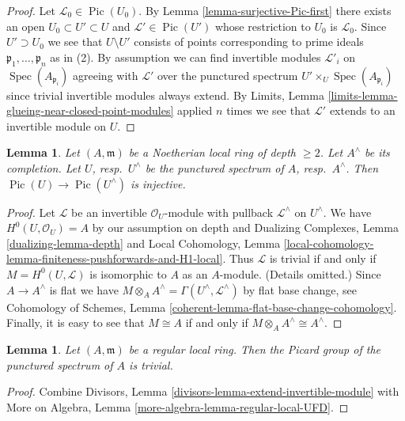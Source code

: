 \documentclass{stacks-project}
\theoremstyle{plain}
\newtheorem{lemma}[subsection]{Lemma}
\theoremstyle{definition}
\theoremstyle{remark}
\numberwithin{equation}{subsection}
\def\Spec{\mathop{\mathrm{Spec}}}
\def\Pic{\mathop{\mathrm{Pic}}\nolimits}
\begin{document}
\begin{proof}
Let $\mathcal{L}_0 \in \Pic(U_0)$. By
Lemma \ref{lemma-surjective-Pic-first}
there exists an open $U_0 \subset U' \subset U$
and $\mathcal{L}' \in \Pic(U')$ whose restriction
to $U_0$ is $\mathcal{L}_0$.
Since $U' \supset U_0$ we see that $U \setminus U'$
consists of points corresponding to prime ideals
$\mathfrak p_1, \ldots, \mathfrak p_n$ as in (2).
By assumption we can find invertible modules
$\mathcal{L}'_i$ on $\Spec(A_{\mathfrak p_i})$ agreeing with
$\mathcal{L}'$ over the punctured spectrum
$U' \times_U \Spec(A_{\mathfrak p_i})$ since
trivial invertible modules always extend.
By Limits, Lemma \ref{limits-lemma-glueing-near-closed-point-modules}
applied $n$ times we see that $\mathcal{L}'$ extends to an
invertible module on $U$.
\end{proof}

\begin{lemma}
\label{lemma-local-pic-to-completion}
Let $(A, \mathfrak m)$ be a Noetherian local ring of depth $\geq 2$.
Let $A^\wedge$ be its completion. Let $U$, resp.\ $U^\wedge$
be the punctured spectrum of $A$, resp.\ $A^\wedge$. Then
$\Pic(U) \to \Pic(U^\wedge)$ is injective.
\end{lemma}

\begin{proof}
Let $\mathcal{L}$ be an invertible $\mathcal{O}_U$-module
with pullback $\mathcal{L}^\wedge$ on $U^\wedge$.
We have $H^0(U, \mathcal{O}_U) = A$ by our assumption on depth and
Dualizing Complexes, Lemma \ref{dualizing-lemma-depth} and
Local Cohomology, Lemma
\ref{local-cohomology-lemma-finiteness-pushforwards-and-H1-local}.
Thus $\mathcal{L}$ is trivial if and only if
$M = H^0(U, \mathcal{L})$ is isomorphic to $A$ as an $A$-module.
(Details omitted.) Since $A \to A^\wedge$ is flat
we have $M \otimes_A A^\wedge = \Gamma(U^\wedge, \mathcal{L}^\wedge)$
by flat base change, see
Cohomology of Schemes, Lemma \ref{coherent-lemma-flat-base-change-cohomology}.
Finally, it is easy to see that $M \cong A$ if and only if
$M \otimes_A A^\wedge \cong A^\wedge$.
\end{proof}

\begin{lemma}
\label{lemma-trivial-local-pic-regular}
Let $(A, \mathfrak m)$ be a regular local ring. Then the Picard
group of the punctured spectrum of $A$ is trivial.
\end{lemma}

\begin{proof}
Combine Divisors, Lemma \ref{divisors-lemma-extend-invertible-module}
with More on Algebra, Lemma \ref{more-algebra-lemma-regular-local-UFD}.
\end{proof}
\end{document}
